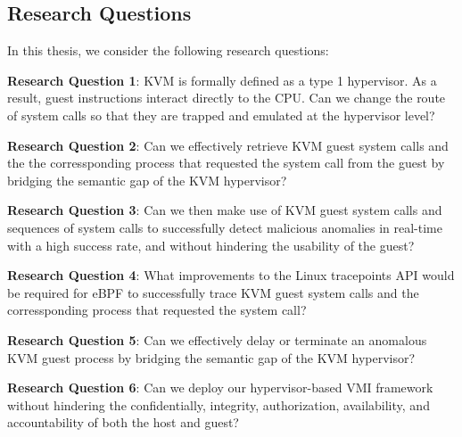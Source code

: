 \documentclass{report}
\begin{document}
\begin{spacing}{1.5}
\section{Research Questions}

{\large
In this thesis, we consider the following research questions:
\newline
}

{\large
\textbf{Research Question 1}: KVM is formally defined as a type 1 hypervisor. As a result, guest instructions interact directly to the CPU. Can we change the route of system calls so that they are trapped and emulated at the hypervisor level?
\newline
}

{\large
\textbf{Research Question 2}: Can we effectively retrieve KVM guest system calls and the the corressponding process that requested the system call from the guest by bridging the semantic gap of the KVM hypervisor?
\newline
}


{\large
\textbf{Research Question 3}: Can we then make use of KVM guest system calls and sequences of system calls to successfully detect malicious anomalies in real-time with a high success rate, and without hindering the usability of the guest?
\newline
}


{\large
\textbf{Research Question 4}: What improvements to the Linux tracepoints API would be required for eBPF to successfully trace KVM guest system calls and the corressponding process that requested the system call?
\newline
}

{\large
\textbf{Research Question 5}: Can we effectively delay or terminate an anomalous KVM guest process by bridging the semantic gap of the KVM hypervisor?
\newline
}

{\large
\textbf{Research Question 6}: Can we deploy our hypervisor-based VMI framework without hindering the confidentially, integrity, authorization, availability, and accountability of both the host and guest?  
\newline
}










\end{spacing}
\end{document}
